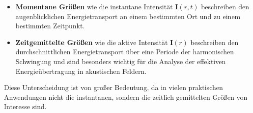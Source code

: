 \begin{itemize}
\item \textbf{Momentane Größen} wie die instantane Intensität $\boldsymbol{I}(r,t)$ beschreiben den augenblicklichen Energietransport an einem bestimmten Ort und zu einem bestimmten Zeitpunkt.

\item \textbf{Zeitgemittelte Größen} wie die aktive Intensität $\boldsymbol{I}(r)$ beschreiben den durchschnittlichen Energietransport über eine Periode der harmonischen Schwingung und sind besonders wichtig für die Analyse der effektiven Energieübertragung in akustischen Feldern.
\end{itemize}

Diese Unterscheidung ist von großer Bedeutung, da in vielen praktischen Anwendungen nicht die instantanen, sondern die zeitlich gemittelten Größen von Interesse sind.




